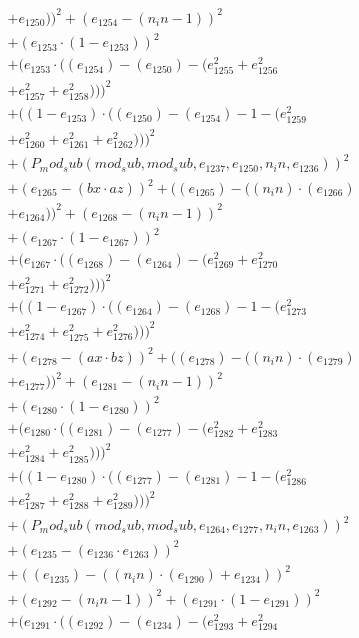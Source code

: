 \documentclass[10pt, a4paper]{article}
\begin{document}
\begin{align*}
& + e_{1250}))^{2} + (e_{1254} - (n_in - 1))^{2} \\
& + (e_{1253}  \cdot  (1 - e_{1253}))^{2} \\
& + (e_{1253}  \cdot  ((e_{1254}) - (e_{1250}) - (e_{1255}^{2} + e_{1256}^{2} \\
& + e_{1257}^{2} + e_{1258}^{2})))^{2} \\
& + ((1 - e_{1253})  \cdot  ((e_{1250}) - (e_{1254}) - 1 - (e_{1259}^{2} \\
& + e_{1260}^{2} + e_{1261}^{2} + e_{1262}^{2})))^{2} \\
& + (P_mod_sub(mod_sub, mod_sub, e_{1237}, e_{1250}, n_in, e_{1236}))^{2} \\
& + (e_{1265} - (bx  \cdot  az))^{2} + ((e_{1265}) - ((n_in)  \cdot  (e_{1266}) \\
& + e_{1264}))^{2} + (e_{1268} - (n_in - 1))^{2} \\
& + (e_{1267}  \cdot  (1 - e_{1267}))^{2} \\
& + (e_{1267}  \cdot  ((e_{1268}) - (e_{1264}) - (e_{1269}^{2} + e_{1270}^{2} \\
& + e_{1271}^{2} + e_{1272}^{2})))^{2} \\
& + ((1 - e_{1267})  \cdot  ((e_{1264}) - (e_{1268}) - 1 - (e_{1273}^{2} \\
& + e_{1274}^{2} + e_{1275}^{2} + e_{1276}^{2})))^{2} \\
& + (e_{1278} - (ax  \cdot  bz))^{2} + ((e_{1278}) - ((n_in)  \cdot  (e_{1279}) \\
& + e_{1277}))^{2} + (e_{1281} - (n_in - 1))^{2} \\
& + (e_{1280}  \cdot  (1 - e_{1280}))^{2} \\
& + (e_{1280}  \cdot  ((e_{1281}) - (e_{1277}) - (e_{1282}^{2} + e_{1283}^{2} \\
& + e_{1284}^{2} + e_{1285}^{2})))^{2} \\
& + ((1 - e_{1280})  \cdot  ((e_{1277}) - (e_{1281}) - 1 - (e_{1286}^{2} \\
& + e_{1287}^{2} + e_{1288}^{2} + e_{1289}^{2})))^{2} \\
& + (P_mod_sub(mod_sub, mod_sub, e_{1264}, e_{1277}, n_in, e_{1263}))^{2} \\
& + (e_{1235} - (e_{1236}  \cdot  e_{1263}))^{2} \\
& + ((e_{1235}) - ((n_in)  \cdot  (e_{1290}) + e_{1234}))^{2} \\
& + (e_{1292} - (n_in - 1))^{2} + (e_{1291}  \cdot  (1 - e_{1291}))^{2} \\
& + (e_{1291}  \cdot  ((e_{1292}) - (e_{1234}) - (e_{1293}^{2} + e_{1294}^{2} \\

\end{align*}
\end{document}
